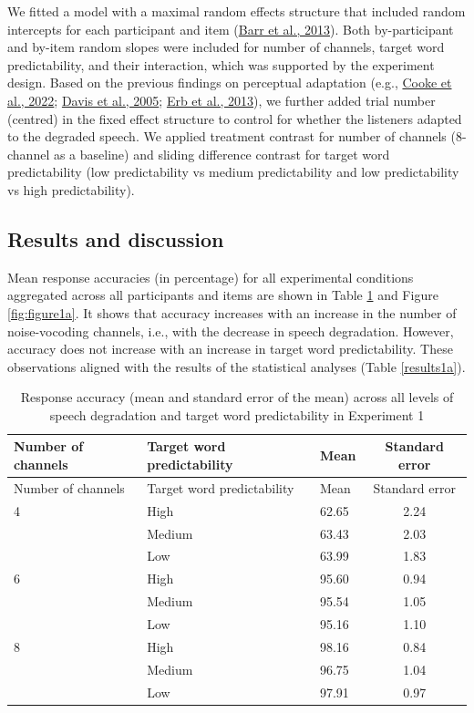 \documentclass[a4paper, nobind]{templates/ociamthesis}
\begin{document}
We fitted a model with a maximal random effects structure that included random intercepts for each participant and item (\protect\hyperlink{ref-Barr2013}{Barr et al., 2013}).
Both by-participant and by-item random slopes were included for number of channels, target word predictability, and their interaction,
which was supported by the experiment design.
Based on the previous findings on perceptual adaptation (e.g., \protect\hyperlink{ref-Cooke2022}{Cooke et al., 2022}; \protect\hyperlink{ref-Davis2005}{Davis et al., 2005}; \protect\hyperlink{ref-Erb2013}{Erb et al., 2013}), we further added trial number (centred) in the fixed effect structure to control for whether the listeners adapted to the degraded speech.
We applied treatment contrast for number of channels (8-channel as a baseline) and sliding difference contrast for target word predictability (low predictability vs medium predictability and low predictability vs high predictability).

\hypertarget{results-and-discussion}{%
\subsection{Results and discussion}\label{results-and-discussion}}

Mean response accuracies (in percentage) for all experimental conditions aggregated across all participants and items are shown in Table \ref{summary1a} and Figure \ref{fig:figure1a}.
It shows that accuracy increases with an increase in the number of noise-vocoding channels, i.e., with the decrease in speech degradation.
However, accuracy does not increase with an increase in target word predictability.
These observations aligned with the results of the statistical analyses (Table \ref{results1a}).

\begin{longtable}[]{@{}lllc@{}}
\caption{Response accuracy (mean and standard error of the mean) across all levels of speech degradation and target word predictability in Experiment 1}
\label{summary1a}
\tabularnewline
\toprule
Number of channels & Target word predictability & Mean & Standard
error \\
\midrule
\endfirsthead
\toprule
Number of channels & Target word predictability & Mean & Standard
error \\
\midrule
\endhead
4 & High & 62.65 & 2.24 \\
& Medium & 63.43 & 2.03 \\
& Low & 63.99 & 1.83 \\
\midrule
6 & High & 95.60 & 0.94 \\
& Medium & 95.54 & 1.05 \\
& Low & 95.16 & 1.10 \\
\midrule
8 & High & 98.16 & 0.84 \\
& Medium & 96.75 & 1.04 \\
& Low & 97.91 & 0.97 \\
\bottomrule
\end{longtable}
\end{document}

